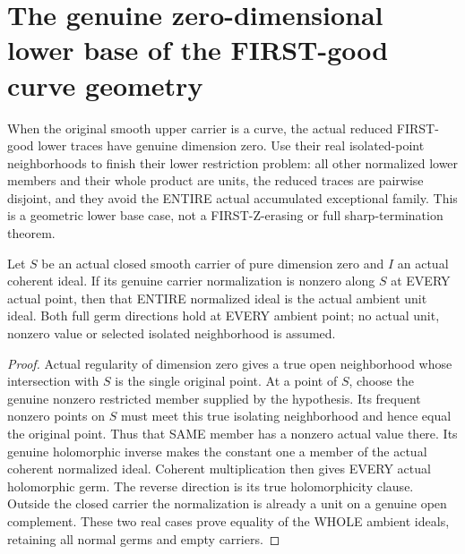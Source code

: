 \section{The genuine zero-dimensional lower base of the FIRST-good curve geometry}

When the original smooth upper carrier is a curve, the actual reduced
FIRST-good lower traces have genuine dimension zero. Use their real
isolated-point neighborhoods to finish their lower restriction problem:
all other normalized lower members and their whole product are units,
the reduced traces are pairwise disjoint, and they avoid the ENTIRE
actual accumulated exceptional family. This is a geometric lower base
case, not a FIRST-Z-erasing or full sharp-termination theorem.

\begin{lemma}
\label{hir:sharp-actual-zero-dimensional-normalized-ideal-unit}
\leanok
Let $S$ be an actual closed smooth carrier of pure dimension zero and
$I$ an actual coherent ideal. If its genuine carrier normalization is
nonzero along $S$ at EVERY actual point, then that ENTIRE normalized
ideal is the actual ambient unit ideal. Both full germ directions hold
at EVERY ambient point; no actual unit, nonzero value or selected
isolated neighborhood is assumed.
\end{lemma}
\begin{proof}
Actual regularity of dimension zero gives a true open neighborhood whose
intersection with $S$ is the single original point. At a point of $S$,
choose the genuine nonzero restricted member supplied by the hypothesis.
Its frequent nonzero points on $S$ must meet this true isolating
neighborhood and hence equal the original point. Thus that SAME member
has a nonzero actual value there. Its genuine holomorphic inverse makes
the constant one a member of the actual coherent normalized ideal.
Coherent multiplication then gives EVERY actual holomorphic germ. The
reverse direction is its true holomorphicity clause. Outside the closed
carrier the normalization is already a unit on a genuine open complement.
These two real cases prove equality of the WHOLE ambient ideals, retaining
all normal germs and empty carriers.
\end{proof}

